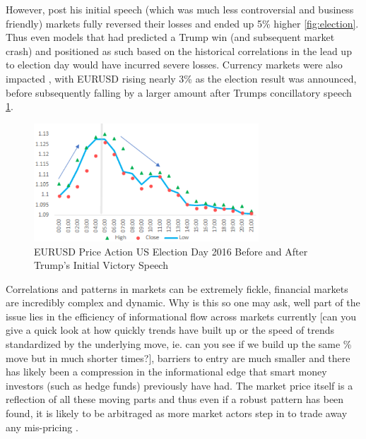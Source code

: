 \documentclass[12pt, a4paper]{article}
\begin{document}
However, post his initial speech (which was much less controversial and business friendly) markets fully reversed their losses and ended up 5\% higher \ref{fig:election}. Thus even models that had predicted a Trump win (and subsequent market crash) and positioned as such based on the historical correlations in the lead up to election day would have incurred severe losses. Currency markets were also impacted , with EURUSD rising nearly 3\% as the election result was announced, before subsequently falling by a larger amount after Trumps concillatory speech \ref{fig:EURElection}. 
\begin{figure}[h]
    \centering
    \includegraphics[width=0.75\textwidth]{EURUSDElection}
    \caption{ EURUSD Price Action US Election Day 2016 Before and After Trump's Initial Victory Speech}
    \label{fig:EURElection}
\end{figure}
\par Correlations and patterns in markets can be extremely fickle, financial markets are incredibly complex and dynamic\cite{Camargo2013}. Why is this so one may ask, well part of the issue lies in the efficiency of informational flow across markets currently [can you give a quick look at how quickly trends have built up or the speed of trends standardized by the underlying move, ie. can you see if we build up the same \% move but in much shorter times?], barriers to entry are much smaller and there has likely been a compression in the informational edge that smart money investors (such as hedge funds) previously have had. The market price itself is a reflection of all these moving parts and thus even if a robust pattern has been found, it is likely to be arbitraged as more market actors step in to trade away any mis-pricing \cite{Bartram2019}. 
\par
\end{document}
